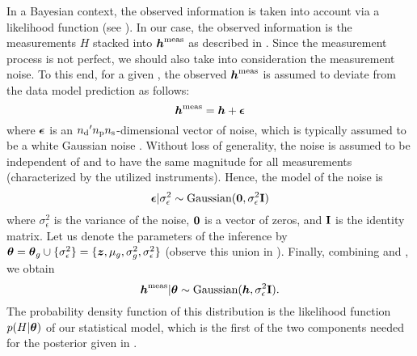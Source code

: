 In a Bayesian context, the observed information is taken into account via a
likelihood function (see ). In our case, the observed
information is the measurements $H$ stacked into $\boldsymbol{h}^{\mathrm{meas}}$ as described
in . Since the measurement process is not perfect, we should
also take into consideration the measurement noise. To this end, for a given
\g, the observed $\boldsymbol{h}^{\mathrm{meas}}$ is assumed to deviate from the data model
prediction \vh as follows:
\begin{equation} \elab{noisy-measurements}
  \vh^\measured = \vh + \v{\epsilon}
\end{equation}
where $\boldsymbol{\epsilon}$ is an ${n_\mathrm{d}}' {n_\mathrm{p}} {n_\mathrm{s}}$-dimensional vector of noise, which is
typically assumed to be a white Gaussian noise \cite{rasmussen2006,
marzouk2009}. Without loss of generality, the noise is assumed to be independent
of \g and to have the same magnitude for all measurements (characterized by the
utilized instruments). Hence, the model of the noise is
\begin{equation} \elab{noise-model}
  \v{\epsilon} | \sigma^2_\epsilon \sim \text{Gaussian}(\v{0}, \sigma^2_\epsilon \m{I})
\end{equation}
where $\sigma^2_\epsilon$ is the variance of the noise, $\boldsymbol{0}$ is a vector of
zeros, and $\mathbf{I}$ is the identity matrix. Let us denote the parameters of the
inference by $\boldsymbol{\theta} = \boldsymbol{\theta}_g \cup \{ \sigma_\epsilon^2 \} = \{ \boldsymbol{z}, \mu_g,
\sigma_g^2, \sigma_\epsilon^2 \}$ (observe this union in ).
Finally, combining  and , we obtain
\begin{equation} \elab{likelihood}
  \vh^\measured | \vt \sim \text{Gaussian}(\vh, \sigma_\epsilon^2 \m{I}).
\end{equation}
The probability density function of this distribution is the likelihood function
$p(H | \boldsymbol{\theta})$ of our statistical model, which is the first of the two components
needed for the posterior given in .

